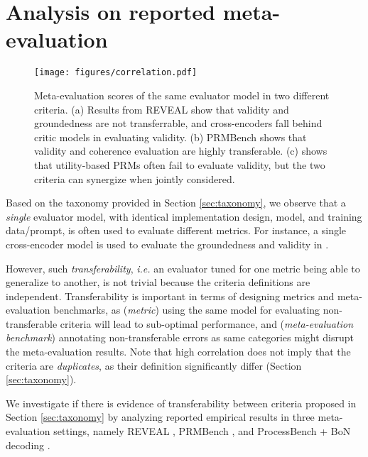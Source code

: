 \section{Analysis on reported meta-evaluation}
\label{sec:transfer}

\begin{figure*}[t]
    \centering
    \texttt{[image: figures/correlation.pdf]}
    \caption{Meta-evaluation scores of the same evaluator model in two different criteria. (a) Results from REVEAL \citet{jacovi-etal-2024-chain} show that validity and groundedness are not transferrable, and cross-encoders fall behind critic models in evaluating validity. (b) PRMBench \citet{song2025prmbenchfinegrainedchallengingbenchmark} shows that validity and coherence evaluation are highly transferable. (c) \citet{zhang2025lessonsdevelopingprocessreward} shows that utility-based PRMs often fail to evaluate validity, but the two criteria can synergize when jointly considered.}
    \label{fig:correlation}
\end{figure*}

Based on the taxonomy provided in Section \ref{sec:taxonomy}, we observe that a \textit{single} evaluator model, with identical implementation design, model, and training data/prompt, is often used to evaluate different metrics. For instance, a single cross-encoder model is used to evaluate the groundedness and validity in \citet{golovneva2023pathfinderguidedsearchmultistep, zhu2024deductivebeamsearchdecoding}.

However, such \textit{transferability}, \textit{i.e.} an evaluator tuned for one metric being able to generalize to another, is not trivial because the criteria definitions are independent. Transferability is important in terms of designing metrics and meta-evaluation benchmarks, as (\textit{metric}) using the same model for evaluating non-transferable criteria will lead to sub-optimal performance, and (\textit{meta-evaluation benchmark}) annotating non-transferable errors as same categories might disrupt the meta-evaluation results. Note that high correlation does not imply that the criteria are \textit{duplicates}, as their definition significantly differ (Section \ref{sec:taxonomy}).

We investigate if there is evidence of transferability between criteria proposed in Section \ref{sec:taxonomy} by analyzing reported empirical results in three meta-evaluation settings, namely REVEAL \citep{jacovi-etal-2024-chain}, PRMBench \citep{song2025prmbenchfinegrainedchallengingbenchmark}, and ProcessBench + BoN decoding \citep{zhang2025lessonsdevelopingprocessreward}.


